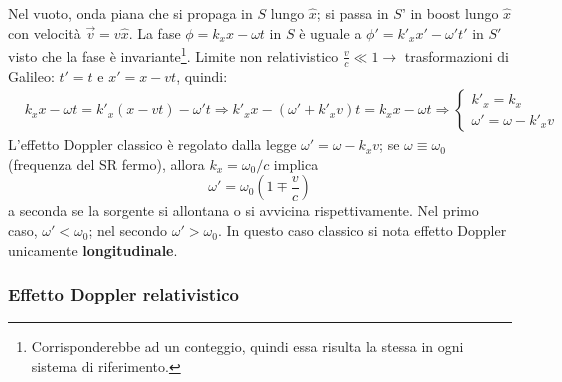 \documentclass[a4paper]{scrartcl}
\numberwithin{equation}{subsection}
\theoremstyle{style1}
\begin{document}
Nel vuoto, onda piana che si propaga in $S$ lungo $\hat{x}$; si passa in $S$' in boost lungo $\hat{x}$ con velocit\`a $\vec{v}= v \hat{x}$. La fase $\phi =k_x x - \omega t$ in $S$ \`e uguale a $\phi ' = k'_x x' - \omega' t'$ in $S'$ visto che la fase \`e invariante\footnote{Corrisponderebbe ad un conteggio, quindi essa risulta la stessa in ogni sistema di riferimento.}. Limite non relativistico $\frac{v}{c}\ll 1 \to$ trasformazioni di Galileo: $t' = t$ e $x' = x-vt$, quindi:
\[
\begin{split}
	&k_x x - \omega t = k'_x(x-vt) - \omega 't \Rightarrow k'_x x - (\omega' + k'_x v ) t = k_x x - \omega t \Rightarrow \begin{cases}
		k'_x = k_x\\
		\omega' = \omega- k'_x v
	\end{cases}
\end{split}
\] 
L'effetto Doppler classico \`e regolato dalla legge $\omega'=\omega-k_x v$; se $\omega\equiv \omega_0$ (frequenza del SR fermo), allora $k_x = \omega_0 / c$ implica
\begin{equation}
	\omega'=\omega_0 \left(1 \mp \frac{v}{c}\right) 
\end{equation}
a seconda se la sorgente si allontana o si avvicina rispettivamente. Nel primo caso, $\omega' < \omega_0$; nel secondo $\omega' > \omega_0$. In questo caso classico si nota effetto Doppler unicamente \textbf{longitudinale}.

\subsubsection{Effetto Doppler relativistico}
\end{document}
